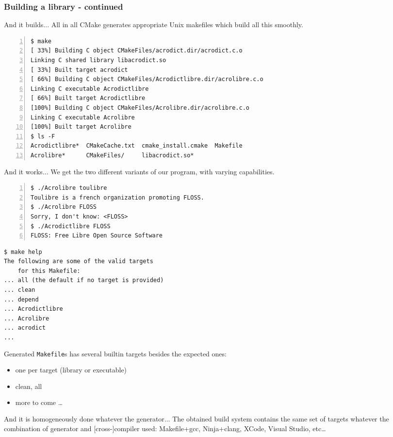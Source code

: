 \documentclass[compress,slidestop,table
              ]
               {beamer}
\newcommand{\fname}[1]{\texttt{#1}}
\begin{document}
\begin{frame}
\frametitle{Building a library - continued}

\begin{block}{And it builds...}
All in all CMake generates appropriate Unix makefiles which build
all this smoothly.
\end{block}
\begin{Verbatim}[fontsize=\tiny,numbers=left,frame=topline,label=CMake + Unix Makefile]
$ make
[ 33%] Building C object CMakeFiles/acrodict.dir/acrodict.c.o
Linking C shared library libacrodict.so
[ 33%] Built target acrodict
[ 66%] Building C object CMakeFiles/Acrodictlibre.dir/acrolibre.c.o
Linking C executable Acrodictlibre
[ 66%] Built target Acrodictlibre
[100%] Building C object CMakeFiles/Acrolibre.dir/acrolibre.c.o
Linking C executable Acrolibre
[100%] Built target Acrolibre
$ ls -F
Acrodictlibre*  CMakeCache.txt  cmake_install.cmake  Makefile
Acrolibre*      CMakeFiles/     libacrodict.so*
\end{Verbatim}

\begin{block}{And it works...}
We get the two different variants of our program, with varying capabilities.
\end{block}
\begin{multicols}{2}
\begin{Verbatim}[fontsize=\tiny,numbers=left]
$ ./Acrolibre toulibre
Toulibre is a french organization promoting FLOSS.
$ ./Acrolibre FLOSS
Sorry, I don't know: <FLOSS>
$ ./Acrodictlibre FLOSS
FLOSS: Free Libre Open Source Software
\end{Verbatim}
\begin{Verbatim}[fontsize=\tiny,]
$ make help
The following are some of the valid targets
    for this Makefile:
... all (the default if no target is provided)
... clean
... depend
... Acrodictlibre
... Acrolibre
... acrodict
...
\end{Verbatim}
Generated \fname{Makefile}s has several builtin targets besides the
expected ones:
\begin{itemize}
\item one per target (library or executable)
\item clean, all
\item more to come \ldots
\end{itemize}
\end{multicols}

\begin{alertblock}{And it is homogeneously done whatever the generator...}
  The obtained build system contains the same set of targets whatever the combination
  of generator and [cross-]compiler used: Makefile+gcc, Ninja+clang, XCode, Visual Studio, etc\ldots
\end{alertblock}
\end{frame}
\end{document}
